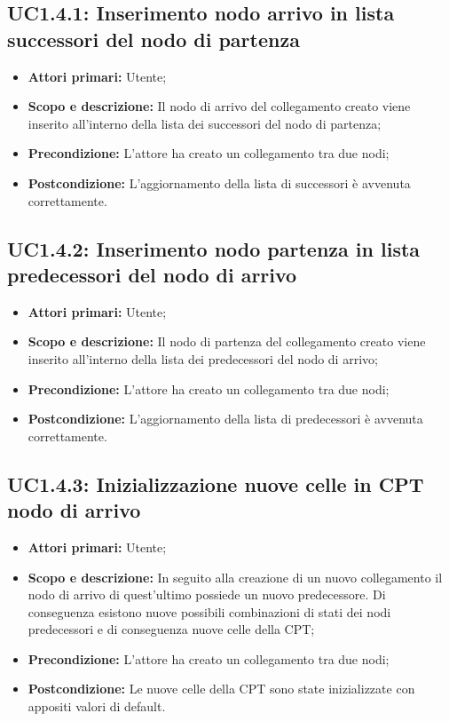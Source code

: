 \subsection{UC1.4.1: Inserimento nodo arrivo in lista successori del nodo di partenza} 
\begin{itemize} 
	\item{\textbf{Attori primari:} Utente;} 
	\item{\textbf{Scopo e descrizione:} Il nodo di arrivo del collegamento creato viene inserito all'interno della lista dei successori del nodo di partenza;} 
	\item{\textbf{Precondizione:} L'attore ha creato un collegamento tra due nodi;} 
	\item{\textbf{Postcondizione:} L'aggiornamento della lista di successori è avvenuta correttamente.} 
\end{itemize} 
\subsection{UC1.4.2: Inserimento nodo partenza in lista predecessori del nodo di arrivo} 
\begin{itemize} 
	\item{\textbf{Attori primari:} Utente;} 
	\item{\textbf{Scopo e descrizione:} Il nodo di partenza del collegamento creato viene inserito all'interno della lista dei predecessori del nodo di arrivo;} 
	\item{\textbf{Precondizione:} L'attore ha creato un collegamento tra due nodi;} 
	\item{\textbf{Postcondizione:} L'aggiornamento della lista di predecessori è avvenuta correttamente.} 
\end{itemize} 
\subsection{UC1.4.3: Inizializzazione nuove celle in CPT nodo di arrivo} 
\begin{itemize} 
	\item{\textbf{Attori primari:} Utente;} 
	\item{\textbf{Scopo e descrizione:} In seguito alla creazione di un nuovo collegamento il nodo di arrivo di quest'ultimo possiede un nuovo predecessore. Di conseguenza esistono nuove possibili combinazioni di stati dei nodi predecessori e di conseguenza nuove celle della CPT;} 
	\item{\textbf{Precondizione:} L'attore ha creato un collegamento tra due nodi;} 
	\item{\textbf{Postcondizione:} Le nuove celle della CPT sono state inizializzate con appositi valori di default.} 
\end{itemize} 

